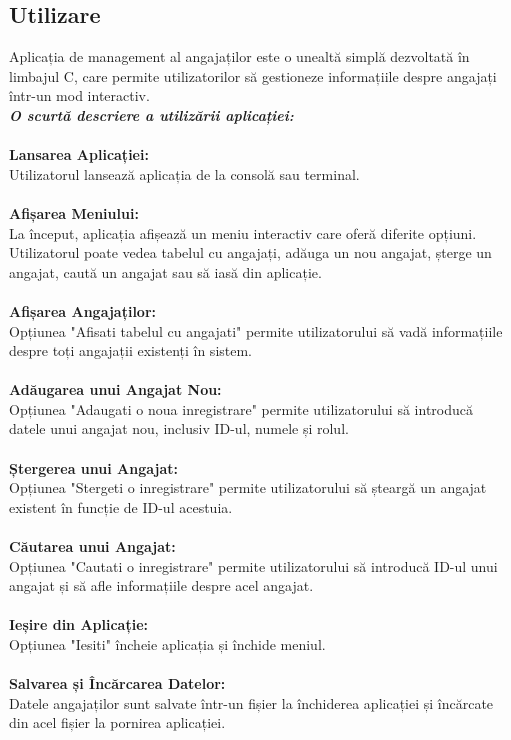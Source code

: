 \documentclass[12pt,a4paper]{article}
\begin{document}
\subsection{Utilizare}
Aplicația de management al angajaților este o unealtă simplă dezvoltată în limbajul C, care permite utilizatorilor să gestioneze informațiile despre angajați într-un mod interactiv. \\
\textbf{\textit{O scurtă descriere a utilizării aplicației:\\\\}}
\textbf{Lansarea Aplicației:\\}
Utilizatorul lansează aplicația de la consolă sau terminal.\\\\
\textbf{Afișarea Meniului:\\}
La început, aplicația afișează un meniu interactiv care oferă diferite opțiuni. Utilizatorul poate vedea tabelul cu angajați, adăuga un nou angajat, șterge un angajat, caută un angajat sau să iasă din aplicație.\\\\
\textbf{Afișarea Angajaților:\\}
Opțiunea "Afisati tabelul cu angajati" permite utilizatorului să vadă informațiile despre toți angajații existenți în sistem.\\\\
\textbf{Adăugarea unui Angajat Nou:\\}
Opțiunea "Adaugati o noua inregistrare" permite utilizatorului să introducă datele unui angajat nou, inclusiv ID-ul, numele și rolul.\\\\
\textbf{Ștergerea unui Angajat:\\}
Opțiunea "Stergeti o inregistrare" permite utilizatorului să șteargă un angajat existent în funcție de ID-ul acestuia.\\\\
\textbf{Căutarea unui Angajat:\\}
Opțiunea "Cautati o inregistrare" permite utilizatorului să introducă ID-ul unui angajat și să afle informațiile despre acel angajat.\\\\
\textbf{Ieșire din Aplicație:\\}
Opțiunea "Iesiti" încheie aplicația și închide meniul.\\\\
\textbf{Salvarea și Încărcarea Datelor:\\}
Datele angajaților sunt salvate într-un fișier la închiderea aplicației și încărcate din acel fișier la pornirea aplicației.\\\\
\end{document}
